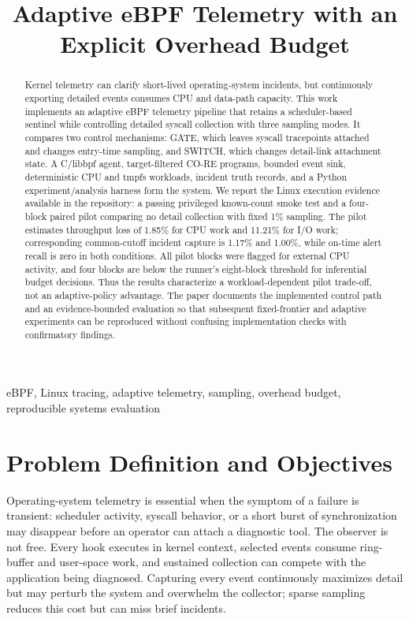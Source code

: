 \documentclass[conference]{IEEEtran}
\title{Adaptive eBPF Telemetry with an Explicit Overhead Budget}
\author{\IEEEauthorblockN{Author name(s)}
\IEEEauthorblockA{Operating Systems Course\\
Institution and contact information to be completed}}
\begin{document}
\maketitle

\begin{abstract}
Kernel telemetry can clarify short-lived operating-system incidents, but continuously exporting detailed events consumes CPU and data-path capacity. This work implements an adaptive eBPF telemetry pipeline that retains a scheduler-based sentinel while controlling detailed syscall collection with three sampling modes. It compares two control mechanisms: GATE, which leaves syscall tracepoints attached and changes entry-time sampling, and SWITCH, which changes detail-link attachment state. A C/libbpf agent, target-filtered CO-RE programs, bounded event sink, deterministic CPU and tmpfs workloads, incident truth records, and a Python experiment/analysis harness form the system. We report the Linux execution evidence available in the repository: a passing privileged known-count smoke test and a four-block paired pilot comparing no detail collection with fixed 1\% sampling. The pilot estimates throughput loss of 1.85\% for CPU work and 11.21\% for I/O work; corresponding common-cutoff incident capture is 1.17\% and 1.00\%, while on-time alert recall is zero in both conditions. All pilot blocks were flagged for external CPU activity, and four blocks are below the runner's eight-block threshold for inferential budget decisions. Thus the results characterize a workload-dependent pilot trade-off, not an adaptive-policy advantage. The paper documents the implemented control path and an evidence-bounded evaluation so that subsequent fixed-frontier and adaptive experiments can be reproduced without confusing implementation checks with confirmatory findings.
\end{abstract}

\begin{IEEEkeywords}
eBPF, Linux tracing, adaptive telemetry, sampling, overhead budget, reproducible systems evaluation
\end{IEEEkeywords}

\section{Problem Definition and Objectives}
Operating-system telemetry is essential when the symptom of a failure is transient: scheduler activity, syscall behavior, or a short burst of synchronization may disappear before an operator can attach a diagnostic tool. The observer is not free. Every hook executes in kernel context, selected events consume ring-buffer and user-space work, and sustained collection can compete with the application being diagnosed. Capturing every event continuously maximizes detail but may perturb the system and overwhelm the collector; sparse sampling reduces this cost but can miss brief incidents.
\end{document}
